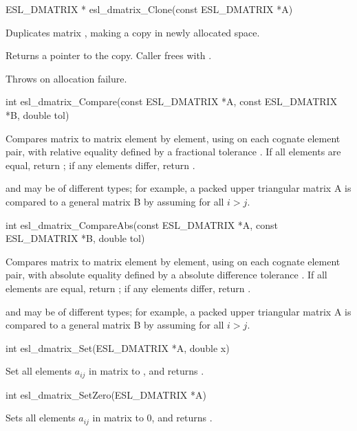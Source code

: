 \begin{sreapi}
\hypertarget{func:esl_dmatrix_Clone()}
{\item[ESL\_DMATRIX * esl\_dmatrix\_Clone(const ESL\_DMATRIX *A)]}

Duplicates matrix , making a copy in newly
allocated space.

Returns a pointer to the copy. Caller frees with 
.

Throws  on allocation failure.


\hypertarget{func:esl_dmatrix_Compare()}
{\item[int esl\_dmatrix\_Compare(const ESL\_DMATRIX *A, const ESL\_DMATRIX *B, double tol)]}

Compares matrix  to matrix  element by element,
using  on each cognate element pair,
with relative equality defined by a fractional tolerance
.  If all elements are equal, return ; if
any elements differ, return .

 and  may be of different types; for example,
a packed upper triangular matrix A is compared to
a general matrix B by assuming  for
all $i>j$.


\hypertarget{func:esl_dmatrix_CompareAbs()}
{\item[int esl\_dmatrix\_CompareAbs(const ESL\_DMATRIX *A, const ESL\_DMATRIX *B, double tol)]}

Compares matrix  to matrix  element by element,
using  on each cognate element pair,
with absolute equality defined by a absolute difference tolerance
.  If all elements are equal, return ; if
any elements differ, return .

 and  may be of different types; for example,
a packed upper triangular matrix A is compared to
a general matrix B by assuming  for
all $i>j$.


\hypertarget{func:esl_dmatrix_Set()}
{\item[int esl\_dmatrix\_Set(ESL\_DMATRIX *A, double x)]}

Set all elements $a_{ij}$ in matrix  to ,
and returns .


\hypertarget{func:esl_dmatrix_SetZero()}
{\item[int esl\_dmatrix\_SetZero(ESL\_DMATRIX *A)]}

Sets all elements $a_{ij}$ in matrix  to 0,
and returns .



\end{sreapi}

